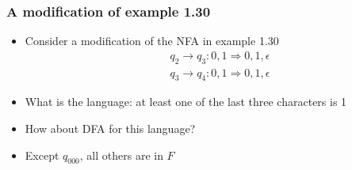 \begin{frame}[allowframebreaks] \frametitle{A modification of example 1.30}
  \begin{itemize}

\item Consider a modification of the NFA in example 1.30
  \begin{equation*}
    \begin{split}
& q_2 \rightarrow q_3:0,1 \Rightarrow 0,1,\epsilon\\
& q_3 \rightarrow q_4:0,1 \Rightarrow 0,1,\epsilon
\end{split}
\end{equation*}
\framebreak
\begin{center}
    \end{center}

  \item What is the language: at least one of the last three characters
    is 1
\item How about DFA for this language?

\item [] Except $q_{000}$, all others are in $F$
\end{itemize}\end{frame}


